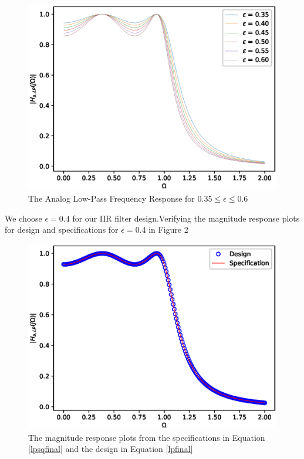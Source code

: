 \documentclass{article}
\begin{document}
\begin{enumerate}
\begin{figure}
\label{fig1}
\includegraphics[width = 15cm]{./figs/para_plot.eps}
\caption{The Analog Low-Pass Frequency Response for $0.35 \leq \epsilon \leq 0.6$}
\end{figure}
We choose $\epsilon = 0.4$  for our IIR filter design.Verifying the magnitude response plots for design and specifications for $\epsilon = 0.4$ in Figure 2
\begin{figure}
\label{fig2}
\includegraphics[width = 15cm]{./figs/specs.eps}
\caption{The magnitude response plots from the specifications in Equation \ref{lpsqfinal} and the design in Equation \ref{lpfinal}}
\end{figure} 


\end{enumerate}
\end{document}
